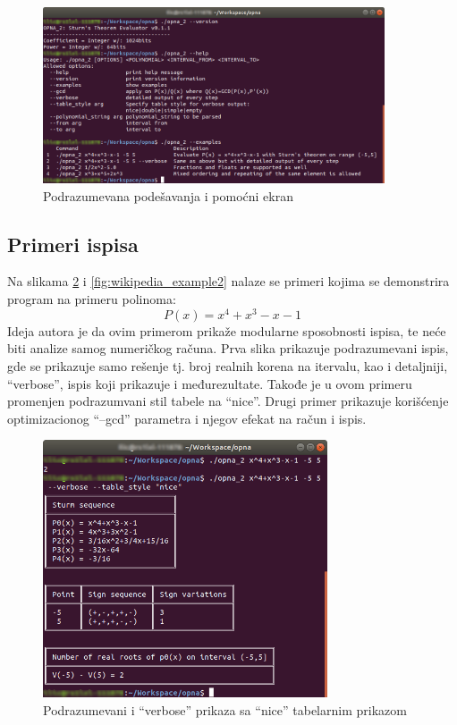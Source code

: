 \documentclass[a4paper,10pt]{article}
\begin{document}
\begin{figure}[h]
\begin{center}
\includegraphics[width=0.9\textwidth]{version.png}
\caption{Podrazumevana podešavanja i pomoćni ekran}
\label{fig:version}
\end{center}
\end{figure}

\subsection{Primeri ispisa}

Na slikama \ref{fig:wikipedia_example1} i \ref{fig:wikipedia_example2} nalaze se primeri kojima se demonstrira program na primeru polinoma: 
\[P(x)=x^4+x^3-x-1\] 
Ideja autora je da ovim primerom prikaže modularne sposobnosti ispisa, te neće biti analize samog numeričkog računa. 
Prva slika prikazuje podrazumevani ispis, gde se prikazuje samo rešenje tj. broj realnih korena na itervalu, kao i detaljniji, ``verbose'', ispis koji prikazuje i međurezultate. Takođe je u ovom primeru promenjen podrazumvani stil tabele na ``nice''. Drugi primer prikazuje korišćenje optimizacionog ``--gcd'' parametra i njegov efekat na račun i ispis.

\begin{figure}
\begin{center}
\includegraphics[width=0.75\textwidth]{wikipedia_example1.png}
\caption{Podrazumevani i ``verbose'' prikaza sa ``nice'' tabelarnim prikazom}
\label{fig:wikipedia_example1}
\end{center}
\end{figure}
\end{document}

